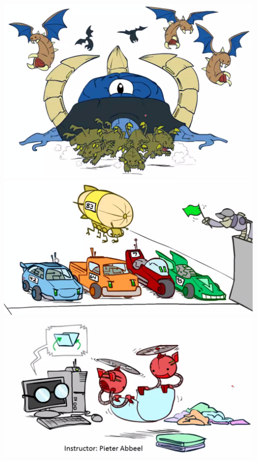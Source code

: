\documentclass[twocolumn]{article}
\begin{document}
{\includegraphics[scale=0.5]{snapshot165}\\
\includegraphics[scale=0.5]{snapshot166}\\
\includegraphics[scale=0.5]{snapshot167}\\
}
\end{document}
